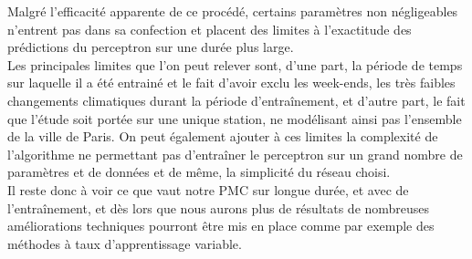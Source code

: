 \documentclass[a4paper, 11pt]{article}
\begin{document}
	Malgré l'efficacité apparente de ce procédé, certains paramètres non négligeables n'entrent pas dans sa confection et placent des limites à l'exactitude des prédictions du perceptron sur une durée plus large.\\
	Les principales limites que l'on peut relever sont, d'une part, la période de temps sur laquelle il a été entrainé et le fait d'avoir exclu les week-ends, les très faibles changements climatiques durant la période d'entraînement, et d'autre part, le fait que l'étude soit portée sur une unique station, ne modélisant ainsi pas l'ensemble de la ville de Paris. On peut également ajouter à ces limites la complexité de l'algorithme ne permettant pas d'entraîner le perceptron sur un grand nombre de paramètres et de données et de même, la simplicité du réseau choisi.\\
	Il reste donc à voir ce que vaut notre PMC sur longue durée, et avec de l’entraînement, et dès lors que nous aurons plus de résultats de nombreuses améliorations techniques pourront être mis en place comme par exemple des méthodes à taux d’apprentissage variable.


 
\end{document}
